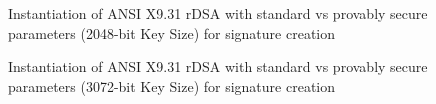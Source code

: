 \documentclass[]{final_report}
\theoremstyle{definition}
\begin{document}
\begin{figure}[H]
    \centering %
     \caption{Instantiation of ANSI X9.31 rDSA with standard vs provably secure parameters (2048-bit Key Size) for signature creation}
    \begin{minipage}{\textwidth}
        \centering
    \end{minipage}
            \label{ansi_sign_2048bit_table}
  \end{figure}
  
\begin{figure}[H]
    \centering %
     \caption{Instantiation of ANSI X9.31 rDSA with standard vs provably secure parameters (3072-bit Key Size) for signature creation}
    \begin{minipage}{\textwidth}
        \centering
    \end{minipage}
         \label{ansi_sign_3072bit_table}
\end{figure}
\end{document}
